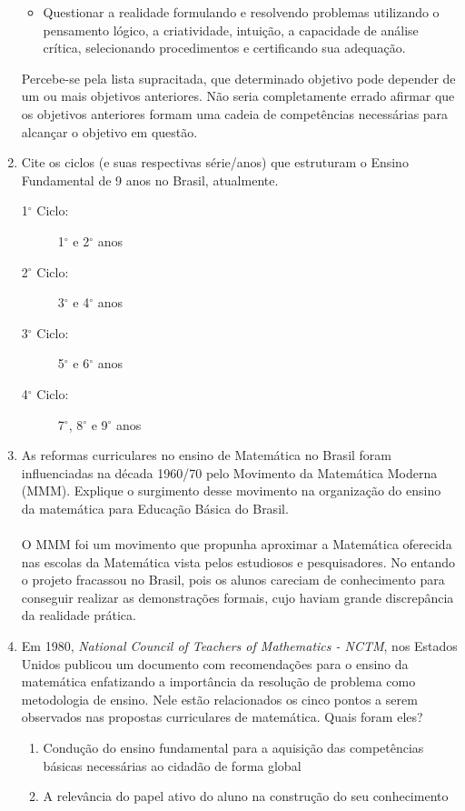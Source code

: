 \documentclass[a4paper, 12pt]{article}
\begin{document}
\begin{enumerate}
\begin{itemize}
  \item Questionar a realidade formulando e resolvendo problemas utilizando o pensamento lógico, a criatividade, intuição, a capacidade de análise crítica, selecionando procedimentos e certificando sua adequação.    
  \end{itemize}
  Percebe-se pela lista supracitada, que determinado objetivo pode depender de um ou mais objetivos anteriores. Não seria completamente errado afirmar que os objetivos anteriores formam uma cadeia de competências necessárias para alcançar o objetivo em questão.
\item Cite os ciclos (e suas respectivas série/anos) que estruturam o Ensino Fundamental de 9 anos no Brasil, atualmente.
  \begin{description}
  \item[1$^{\circ}$ Ciclo:] 1$^{\circ}$ e 2$^{\circ}$ anos
  \item[2$^{\circ}$ Ciclo:] 3$^{\circ}$ e 4$^{\circ}$ anos
  \item[3$^{\circ}$ Ciclo:] 5$^{\circ}$ e 6$^{\circ}$ anos
  \item[4$^{\circ}$ Ciclo:] 7$^{\circ}$, 8$^{\circ}$ e 9$^{\circ}$ anos
  \end{description}
\item As reformas curriculares no ensino de Matemática no Brasil foram influenciadas na década 1960/70 pelo Movimento da Matemática Moderna (MMM). Explique o surgimento desse movimento na organização do ensino da matemática para Educação Básica do Brasil. \\ \\
 O MMM foi um movimento que propunha aproximar a Matemática oferecida nas escolas da Matemática vista pelos estudiosos e pesquisadores. No entando o projeto fracassou no Brasil, pois os alunos careciam de conhecimento para conseguir realizar as demonstrações formais, cujo haviam grande discrepância da realidade prática.
\item Em 1980, \textit{National Council of Teachers of Mathematics - NCTM}, nos Estados Unidos publicou um documento com recomendações para o ensino da matemática enfatizando a importância da resolução de problema como metodologia de ensino. Nele estão relacionados os cinco pontos a serem observados nas propostas curriculares de matemática. Quais foram eles?
  \begin{enumerate}
  \item Condução do ensino fundamental para a aquisição das competências básicas necessárias ao cidadão de forma global
  \item A relevância do papel ativo do aluno na construção do seu conhecimento

\end{enumerate}
\end{enumerate}
\end{document}
